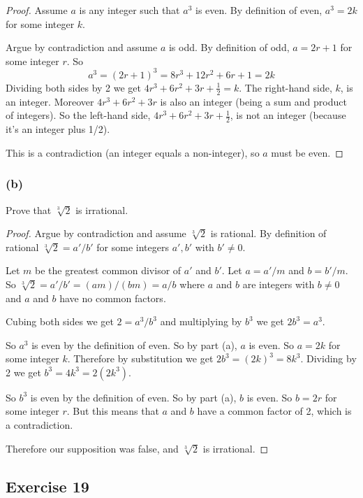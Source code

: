 \documentclass[14pt]{extarticle}
\begin{document}
\begin{proof}
Assume $a$ is any integer such that $a^3$ is even. By definition of even, $a^3 = 2k$ for some integer $k$.

Argue by contradiction and assume $a$ is odd. By definition of odd, $a = 2r+1$ for some integer $r$. So
\[
a^3 = (2r+1)^3 = 8r^3 + 12r^2 + 6r + 1 = 2k
\]
Dividing both sides by 2 we get $4r^3 + 6r^2 + 3r + \frac{1}{2} = k$. The right-hand side, $k$, is an integer. Moreover $4r^3 + 6r^2 + 3r$ is also an integer (being a sum and product of integers). So the left-hand side, $4r^3 + 6r^2 + 3r + \frac{1}{2}$, is not an integer (because it's an integer plus 1/2). 

This is a contradiction (an integer equals a non-integer), so $a$ must be even.
\end{proof}

\subsubsection{(b)}
Prove that $\sqrt[3]{2}$ is irrational.

\begin{proof}
Argue by contradiction and assume $\sqrt[3]{2}$ is rational. By definition of rational $\sqrt[3]{2} = a'/b'$ for some integers $a',b'$ with $b' \neq 0$. 

Let $m$ be the greatest common divisor of $a'$ and $b'$. Let $a = a'/m$ and $b = b'/m$. So $\sqrt[3]{2} = a'/b' = (am) / (bm) = a/b$ where $a$ and $b$ are integers with $b \neq 0$ and $a$ and $b$ have no common factors.

Cubing both sides we get $2 = a^3 / b^3$ and multiplying by $b^3$ we get $2b^3 = a^3$.

So $a^3$ is even by the definition of even. So by part (a), $a$ is even. So $a = 2k$ for some integer $k$. Therefore by substitution we get $2b^3 = (2k)^3 = 8k^3$. Dividing by 2 we get $b^3 = 4k^3 = 2(2k^3)$.

So $b^3$ is even by the definition of even. So by part (a), $b$ is even. So $b = 2r$ for some integer $r$. But this means that $a$ and $b$ have a common factor of 2, which is a contradiction.

Therefore our supposition was false, and $\sqrt[3]{2}$ is irrational.
\end{proof}

\subsection{Exercise 19}
\end{document}
